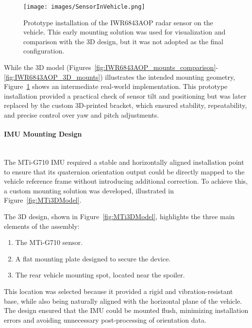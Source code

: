\begin{figure}[!htbp]
    \centering
    \texttt{[image: images/SensorInVehicle.png]}
    \caption{Prototype installation of the IWR6843AOP radar sensor on the vehicle. 
    This early mounting solution was used for visualization and comparison with the 3D design, but it was not adopted as the final configuration.}
    \label{fig:SensorInVehicle}
\end{figure}

While the 3D model (Figures~\ref{fig:IWR6843AOP_mounts_comparison}-\ref{fig:IWR6843AOP_3D_mounts}) illustrates the intended mounting geometry, Figure~\ref{fig:SensorInVehicle} shows an intermediate real-world implementation.
This prototype installation provided a practical check of sensor tilt and positioning but was later replaced by the custom 3D-printed bracket, which ensured stability, repeatability, and precise control over yaw and pitch adjustments.

\vspace{0.5em}
\paragraph{IMU Mounting Design}
\hfill
\\
\indent The MTi-G710 IMU required a stable and horizontally aligned installation point to ensure that its quaternion orientation output could be directly mapped to the vehicle reference frame without introducing additional correction.  
To achieve this, a custom mounting solution was developed, illustrated in Figure~\ref{fig:MTi3DModel}.  

\vspace{3\baselineskip}
The 3D design, shown in Figure~\ref{fig:MTi3DModel}, highlights the three main elements of the assembly:  
\begin{enumerate}
    \item The MTi-G710 sensor.  
    \item A flat mounting plate designed to secure the device.  
    \item The rear vehicle mounting spot, located near the spoiler.  
\end{enumerate}

This location was selected because it provided a rigid and vibration-resistant base, while also being naturally aligned with the horizontal plane of the vehicle.  
The design ensured that the IMU could be mounted flush, minimizing installation errors and avoiding unnecessary post-processing of orientation data.  

